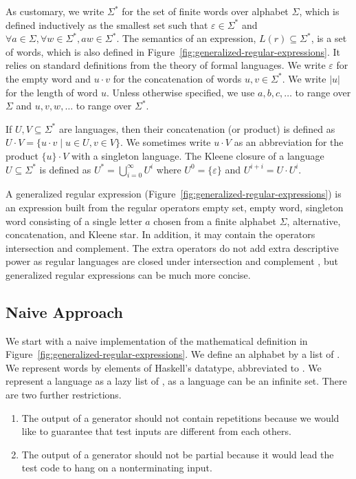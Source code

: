 As customary, we write $\Sigma^*$ for the set of finite words over
alphabet $\Sigma$, which is defined inductively as the smallest set
such that $\varepsilon \in
\Sigma^*$ and $\forall a\in\Sigma, \forall w\in\Sigma^*, aw \in \Sigma^*$.
The semantics of an expression, $L(r) \subseteq \Sigma^*$, is a set of
words, which is also defined in
Figure~\ref{fig:generalized-regular-expressions}. It relies on
standard definitions from the theory of formal languages. We write
$\varepsilon$ for the empty word and $u\cdot v$ for the concatenation
of words $u, v \in \Sigma^*$. We write $|u|$ for the length of word
$u$. Unless otherwise specified, we use $a, b, c, \dots$ to range over
$\Sigma$ and $u, v, w, \dots$ to range over $\Sigma^*$.

If $U, V \subseteq \Sigma^*$ are
languages, then their concatenation (or product) is defined as $U\cdot
V = \{ u\cdot v \mid u\in U, v\in V\}$. We sometimes write $u\cdot V$
as an abbreviation for the product $\{u\}\cdot V$ with a singleton
language. The Kleene closure of a
language $U\subseteq \Sigma^*$ is defined as $U^* =
\bigcup_{i=0}^\infty U^i$ where $U^0 = \{\varepsilon\}$ and $U^{i+i} =
U \cdot U^i$. 

A generalized regular expression
(Figure~\ref{fig:generalized-regular-expressions}) is an expression
built from the regular operators empty set, empty word, singleton word
consisting of a single letter $a$ chosen from a finite alphabet
$\Sigma$, alternative, concatenation, and Kleene star. In addition, it
may contain the operators intersection and complement. The extra
operators do not add extra descriptive power as regular languages are
closed under intersection and complement \cite{AhoHopcroftUllman}, but
generalized regular expressions can be much more concise. 



\subsection{Naive Approach}
\label{sec:naive-approach}

We start with a naive implementation of the mathematical definition in
Figure~\ref{fig:generalized-regular-expressions}. We define an
alphabet by a list of .  We represent words by elements of Haskell's
 datatype, abbreviated to . We
represent a language as a lazy list of , as a language
can be an infinite set. There are two further restrictions.
\begin{enumerate}
\item The output of a generator should not contain repetitions
  because we would like to guarantee that test inputs are different
  from each others.
\item The output of a generator should not be partial because it would
  lead the test code to hang on a nonterminating input.
\end{enumerate}

